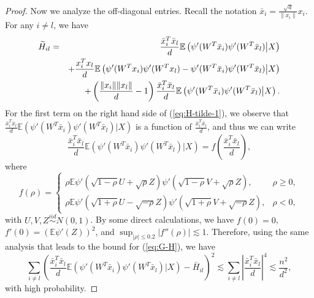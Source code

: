 \begin{proof}
Now we analyze the off-diagonal entries. Recall the notation $\bar{x}_i=\frac{\sqrt{d}}{\|x_i\|}x_i$. For any $i\neq l$, we have
\begin{eqnarray}
\label{eq:H-tilde-1} \wt{H}_{il} &=& \frac{\bar{x}_i^T\bar{x}_l}{d}\mathbb{E}\left(\psi'(W^T\bar{x}_i)\psi'(W^T\bar{x}_l)\big|X\right) \\
\label{eq:H-tilde-2} && + \frac{x_i^Tx_l}{d}\mathbb{E}\left(\psi'(W^T{x}_i)\psi'(W^T{x}_l)-\psi'(W^T\bar{x}_i)\psi'(W^T\bar{x}_l)\big|X\right) \\
\label{eq:H-tilde-3} && + \left(\frac{\|x_i\|\|x_l\|}{d}-1\right)\frac{\bar{x}_i^T\bar{x}_l}{d}\mathbb{E}\left(\psi'(W^T\bar{x}_i)\psi'(W^T\bar{x}_l)\big|X\right).
\end{eqnarray}
For the first term on the right hand side of (\ref{eq:H-tilde-1}), we observe that $\frac{\bar{x}_i^T\bar{x}_l}{d}\mathbb{E}\left(\psi'(W^T\bar{x}_i)\psi'(W^T\bar{x}_l)\big|X\right)$ is a function of $\frac{\bar{x}_i^T\bar{x}_l}{d}$, and thus we can write
$$\frac{\bar{x}_i^T\bar{x}_l}{d}\mathbb{E}\left(\psi'(W^T\bar{x}_i)\psi'(W^T\bar{x}_l)\big|X\right)=f\left(\frac{\bar{x}_i^T\bar{x}_l}{d}\right),$$
where
$$f(\rho)=\begin{cases}
\rho\mathbb{E}\psi'(\sqrt{1-\rho}U+\sqrt{\rho}Z)\psi'(\sqrt{1-\rho}V+\sqrt{\rho}Z), & \rho \geq 0, \\
\rho\mathbb{E}\psi'(\sqrt{1+\rho}U-\sqrt{-\rho}Z)\psi'(\sqrt{1+\rho}V+\sqrt{-\rho}Z), & \rho < 0,
\end{cases}$$
with $U,V,Z\stackrel{iid}{\sim} N(0,1)$. By some direct calculations, we have $f(0)=0$, $f'(0)=(\mathbb{E}\psi'(Z))^2$, and $\sup_{|\rho|\leq 0.2}|f''(\rho)|\lesssim 1$. Therefore, using the same analysis that leads to the bound for (\ref{eq:G-H}), we have
$$\sum_{i\neq l}\left(\frac{\bar{x}_i^T\bar{x}_l}{d}\mathbb{E}\left(\psi'(W^T\bar{x}_i)\psi'(W^T\bar{x}_l)\big|X\right)-\bar{H}_{il}\right)^2 \lesssim \sum_{i\neq l}\left|\frac{\bar{x}_i^T\bar{x}_l}{d}\right|^4\lesssim \frac{n^2}{d^2},$$
with high probability.


\end{proof}
